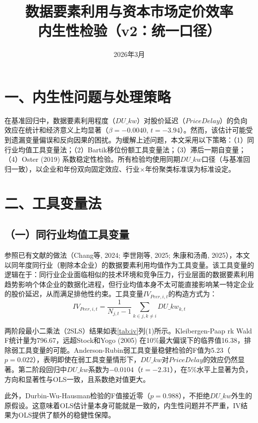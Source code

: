 \documentclass[11pt,a4paper]{article}
\title{{\hei\Large 数据要素利用与资本市场定价效率} \\[8pt]
{\large 内生性检验（v2：统一口径）}}
\author{}
\date{2026年3月}
\begin{document}
\maketitle
\thispagestyle{fancy}

\section*{一、内生性问题与处理策略}

在基准回归中，数据要素利用程度（$DU\_kw$）对股价延迟（$PriceDelay$）的负向效应在统计和经济意义上均显著（$\beta=-0.0040$, $t=-3.94$）。然而，该估计可能受到遗漏变量偏误和反向因果的困扰。为缓解上述问题，本文采用以下策略：（1）同行业均值工具变量法；（2）Bartik移位份额工具变量法；（3）滞后一期自变量；（4）Oster (2019) 系数稳定性检验。所有检验均使用同期$DU\_kw$口径（与基准回归一致），以企业和年份双向固定效应、行业$\times$年份聚类标准误为标准设定。

\section*{二、工具变量法}

\subsection*{（一）同行业均值工具变量}

参照已有文献的做法（Chang等, 2024; 李世刚等, 2025; 朱康和汤甬, 2025），本文以同年度同行业（剔除本企业）的数据要素利用均值作为工具变量。该工具变量的逻辑在于：同行业企业面临相似的技术环境和竞争压力，行业层面的数据要素利用趋势影响个体企业的数据化进程，但行业均值本身不太可能直接影响某一特定企业的股价延迟，从而满足排他性约束。工具变量$IV_{Peer,i,t}$的构造方式为：
\begin{equation}
IV_{Peer,i,t} = \frac{1}{N_{j,t}-1}\sum_{k \in j, k \neq i} DU\_kw_{k,t}
\end{equation}

两阶段最小二乘法（2SLS）结果如表\ref{tab:iv}列(1)所示。Kleibergen-Paap rk Wald F统计量为796.67，远超Stock和Yogo (2005) 在10\%最大偏误下的临界值16.38，排除弱工具变量的可能。Anderson-Rubin弱工具变量稳健检验的F值为5.23（$p=0.022$），表明即使在弱工具变量情形下，$DU\_kw$对$PriceDelay$的效应仍然显著。第二阶段回归中$DU\_kw$系数为$-0.0104$（$t=-2.31$），在5\%水平上显著为负，方向和显著性与OLS一致，且系数绝对值更大。

此外，Durbin-Wu-Hausman检验的F值接近零（$p=0.988$），不拒绝$DU\_kw$外生的原假设。这意味着OLS估计量本身可能就是一致的，内生性问题并不严重，IV结果为OLS提供了额外的稳健性保障。
\end{document}
